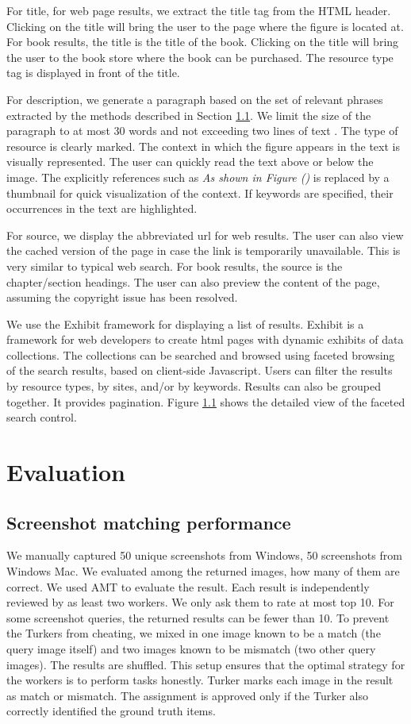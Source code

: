 \documentclass{www2010-submission}
\begin{document}
For title, for web page results, we extract the title tag from the
HTML header. Clicking on the title will bring the user to the page
where the figure is located at. For book results, the title is the
title of the book. Clicking on the title will bring the user to
the book store where the book can be purchased. The resource type
tag is displayed in front of the title.

For description, we generate a paragraph based on the set of
relevant phrases extracted by the methods described in Section
\ref{}. We limit the size of the paragraph to at most 30 words and
not exceeding two lines of text . The type of resource is clearly
marked. The context in which the figure appears in the text is
visually represented. The user can quickly read the text above or
below the image. The explicitly references such as \emph{As shown
in Figure ()} is replaced by a thumbnail for quick visualization
of the context. If keywords are specified, their occurrences in
the text are highlighted.

For source, we display the abbreviated url for web results. The
user can also view the cached version of the page in case the link
is temporarily unavailable. This is very similar to typical web
search. For book results, the source is the chapter/section
headings. The user can also preview the content of the page,
assuming the copyright issue has been resolved.

We use the Exhibit framework for displaying a list of results.
Exhibit is a framework for web developers to create html pages
with dynamic exhibits of data collections. The collections can be
searched and browsed using faceted browsing of the search results,
based on client-side Javascript. Users can filter the results by
resource types, by sites, and/or by keywords. Results can also be
grouped together. It provides pagination. Figure \ref{} shows the
detailed view of the faceted search control.

\section{Evaluation}


\subsection{Screenshot matching performance}

We manually captured 50 unique screenshots from Windows, 50
screenshots from Windows Mac. We evaluated among the returned
images, how many of them are correct. We used AMT to evaluate the
result. Each result is independently reviewed by as least two
workers. We only ask them to rate at most top 10. For some
screenshot queries, the returned results can be fewer than 10. To
prevent the Turkers from cheating, we mixed in one image known to
be a match (the query image itself) and two images known to be
mismatch (two other query images). The results are shuffled. This
setup ensures that the optimal strategy for the workers is to
perform tasks honestly. Turker marks each image in the result as
match or mismatch. The assignment is approved only if the Turker
also correctly identified the ground truth items.
\end{document}
